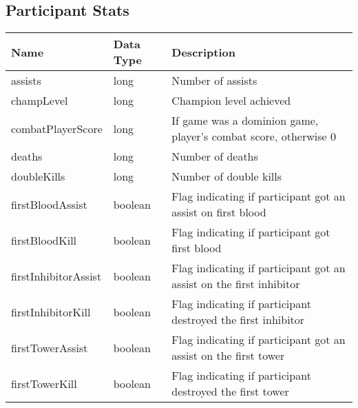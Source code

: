 \FloatBarrier
\subsection{Participant Stats}
\begin{table}[!htb]
\tiny
\centering
\begin{tabular}{|llp{5cm}|}
\hline
\textbf{Name}                   & \textbf{Data Type} & \textbf{Description}                                                            \\ \hline
assists                         & long               & Number of assists                                                               \\ \hline
champLevel                      & long               & Champion level achieved                                                         \\ \hline
combatPlayerScore               & long               & If game was a dominion game, player's combat score, otherwise 0                 \\ \hline
deaths                          & long               & Number of deaths                                                                \\ \hline
doubleKills                     & long               & Number of double kills                                                          \\ \hline
firstBloodAssist                & boolean            & Flag indicating if participant got an assist on first blood                     \\ \hline
firstBloodKill                  & boolean            & Flag indicating if participant got first blood                                  \\ \hline
firstInhibitorAssist            & boolean            & Flag indicating if participant got an assist on the first inhibitor             \\ \hline
firstInhibitorKill              & boolean            & Flag indicating if participant destroyed the first inhibitor                    \\ \hline
firstTowerAssist                & boolean            & Flag indicating if participant got an assist on the first tower                 \\ \hline
firstTowerKill                  & boolean            & Flag indicating if participant destroyed the first tower                        \\ \hline

\end{tabular}
\end{table}
